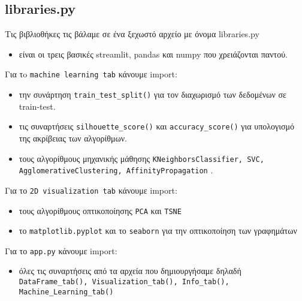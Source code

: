 \documentclass[a4paper,12pt]{article}
\begin{document}
\subsection{libraries.py}
Τις βιβλιοθήκες τις βάλαμε σε ένα ξεχωστό αρχείο με όνομα libraries.py 
\begin{itemize}
  \item είναι οι τρεις βασικές streamlit, pandas και numpy που χρειάζονται παντού.
\end{itemize}
Για τo \texttt{machine learning tab} κάνουμε import:
\begin{itemize}
  \item την συνάρτηση \texttt{train\_test\_split()} για τον διαχωρισμό των δεδομένων σε train-test.
  \item τις συναρτήσεις \texttt{silhouette\_score()} και \texttt{accuracy\_score()} για υπολογισμό της ακρίβειας των αλγορίθμων.
  \item τους αλγορίθμους μηχανικής μάθησης \texttt{KNeighborsClassifier, SVC, AgglomerativeClustering, AffinityPropagation} .
\end{itemize}
Για το \texttt{2D visualization tab} κάνουμε import:
\begin{itemize}
    \item τους αλγορίθμους οπτικοποίησης \texttt{PCA} και \texttt{TSNE}
    \item το \texttt{matplotlib.pyplot} και το \texttt{seaborn} για την οπτικοποίηση των γραφημάτων
\end{itemize}

Για το \texttt{app.py} κάνουμε import:
\begin{itemize}
    \item όλες τις συναρτήσεις από τα αρχεία που δημιουργήσαμε δηλαδή \texttt{DataFrame\_tab(), Visualization\_tab(), Info\_tab(), Machine\_Learning\_tab()}
\end{itemize}
\end{document}
